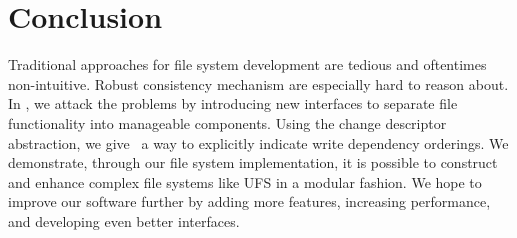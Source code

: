 \section{Conclusion}
\label{sec:conclusion}

Traditional approaches for file system development are tedious and oftentimes
non-intuitive. Robust consistency mechanism are especially hard to reason
about. In \Kudos, we attack the problems by introducing new interfaces to
separate file functionality into manageable components. Using the change
descriptor abstraction, we give \modules\ a way to explicitly indicate write
dependency orderings. We demonstrate, through our file system implementation,
it is possible to construct and enhance complex file systems like UFS in a
modular fashion. We hope to improve our software further by adding more
features, increasing performance, and developing even better interfaces.

